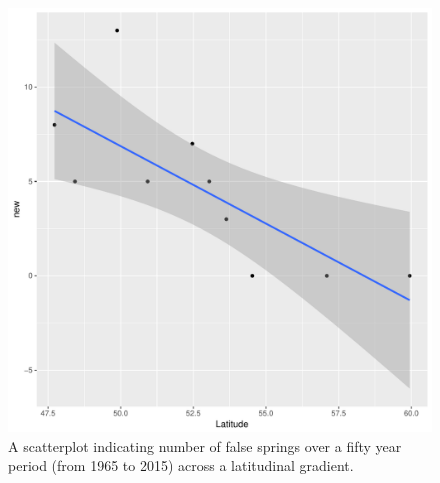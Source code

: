 \documentclass{article}\usepackage[]{graphicx}\usepackage[]{color}
\makeatletter
\def\maxwidth{ %
  \ifdim\Gin@nat@width>\linewidth
    \linewidth
  \else
    \Gin@nat@width
  \fi
}
\newenvironment{kframe}{%
 \def\at@end@of@kframe{}%
 \ifinner\ifhmode%
  \def\at@end@of@kframe{\end{minipage}}%
  \begin{minipage}{\columnwidth}%
 \fi\fi%
 \def\FrameCommand##1{\hskip\@totalleftmargin \hskip-\fboxsep
 \colorbox{shadecolor}{##1}\hskip-\fboxsep
     \hskip-\linewidth \hskip-\@totalleftmargin \hskip\columnwidth}%
 \MakeFramed {\advance\hsize-\width
   \@totalleftmargin\z@ \linewidth\hsize
   \@setminipage}}%
 {\par\unskip\endMakeFramed%
 \at@end@of@kframe}
\makeatother
\begin{document}
\begin{kframe}


{\ttfamily\noindent\bfseries{}}\end{kframe}\begin{figure}[H]
\includegraphics[width=\maxwidth]{figure/fsifig-1} \caption[A scatterplot indicating number of false springs over a fifty year period (from 1965 to 2015) across a latitudinal gradient]{A scatterplot indicating number of false springs over a fifty year period (from 1965 to 2015) across a latitudinal gradient. }\label{fig:fsifig}
\end{figure}




\end{document}
